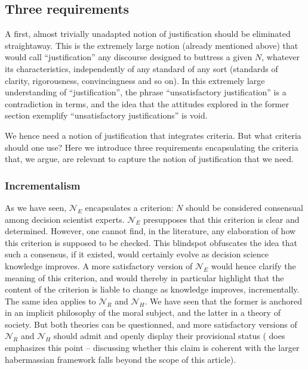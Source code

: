 \documentclass[preprint, french, english, 11pt, authoryear]{elsarticle}%
\begin{document}
\subsection{Three requirements}
A first, almost trivially unadapted notion of justification should be eliminated straightaway. This is the extremely large notion (already mentioned above) that would call ``justification'' any discourse designed to buttress a given $N$, whatever its characteristics, independently of any standard of any sort (standards of clarity, rigorousness, convincingness and so on). In this extremely large understanding of ``justification'', the phrase ``unsatisfactory justification'' is a contradiction in terms, and the idea that the attitudes explored in the former section exemplify ``unsatisfactory justifications'' is void.

We hence need a notion of justification that integrates criteria. But what criteria should one use? Here we introduce three requirements encapsulating the criteria that, we argue, are relevant to capture the notion of justification that we need.

\subsubsection{Incrementalism}
As we have seen, $\mathscr{N}_E$ encapsulates a criterion: $N$ should be considered consensual among decision scientist experts. $\mathscr{N}_E$ presupposes that this criterion is clear and determined. However, one cannot find, in the literature, any elaboration of how this criterion is supposed to be checked. This blindspot obfuscates the idea that such a consensus, if it existed, would certainly evolve as decision science knowledge improves. A more satisfactory version of $\mathscr{N}_E$ would hence clarify the meaning of this criterion, and would thereby in particular highlight that the content of the criterion is liable to change as knowledge improves, incrementally. The same idea applies to $\mathscr{N}_{R}$ and $\mathscr{N}_{H}$. We have seen that the former is anchored in an implicit philosophy of the moral subject, and the latter in a theory of society. But both theories can be questionned, and more satisfactory versions of $\mathscr{N}_{R}$ and $\mathscr{N}_{H}$ should admit and openly display their provisional status (\cite{habermas_moralbewustsein_1983} does emphasizes this point -- discussing whether this claim is coherent with the larger habermassian framework falls beyond the scope of this article).
\end{document}
